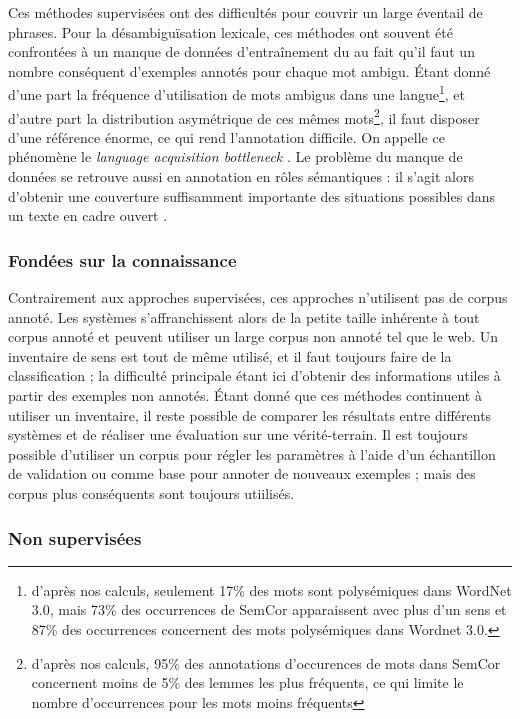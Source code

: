 Ces méthodes supervisées ont des difficultés pour couvrir un large éventail de
phrases. Pour la désambiguïsation lexicale, ces méthodes ont souvent été
confrontées à un manque de données d'entraînement du au fait qu'il faut un
nombre conséquent d'exemples annotés pour chaque mot ambigu. Étant donné d'une
part la fréquence d'utilisation de mots ambigus dans une
langue\footnote{d'après nos calculs, seulement 17\% des mots sont polysémiques
    dans WordNet 3.0, mais 73\% des occurrences de SemCor apparaissent avec
    plus d'un sens et 87\% des occurrences concernent des mots polysémiques
dans Wordnet 3.0.}, et d'autre part la distribution asymétrique de ces mêmes
mots\footnote{d'après nos calculs, 95\% des annotations d'occurences de mots
    dans SemCor concernent moins de 5\% des lemmes les plus fréquents, ce qui
limite le nombre d'occurrences pour les mots moins fréquents}, il faut disposer
d'une référence énorme, ce qui rend l'annotation difficile. On appelle ce
phénomène le \textit{language acquisition bottleneck} \citep{gale1992using}. Le
problème du manque de données se retrouve aussi en annotation en rôles
sémantiques : il s'agit alors d'obtenir une couverture suffisamment importante
des situations possibles dans un texte en cadre ouvert
\cite[p.~155]{marquez2008semantic}.

\subsubsection{Fondées sur la connaissance}

Contrairement aux approches supervisées, ces approches n'utilisent pas de
corpus annoté. Les systèmes s'affranchissent alors de la petite taille
inhérente à tout corpus annoté et peuvent utiliser un large corpus non annoté
tel que le web. Un inventaire de sens est tout de même utilisé, et il faut
toujours faire de la classification ; la difficulté principale étant ici
d'obtenir des informations utiles à partir des exemples non annotés. Étant
donné que ces méthodes continuent à utiliser un inventaire, il reste possible
de comparer les résultats entre différents systèmes et de réaliser une
évaluation sur une vérité-terrain. Il est toujours possible d'utiliser un
corpus pour régler les paramètres à l'aide d'un échantillon de validation ou
comme base pour annoter de nouveaux exemples ; mais des corpus plus conséquents
sont toujours utiilisés.

\subsubsection{Non supervisées}

